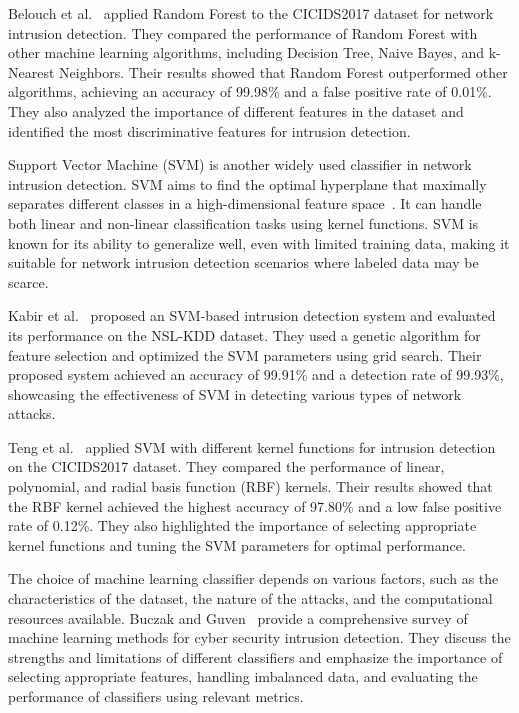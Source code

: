 Belouch et al.~\cite{belouch2018performance} applied Random Forest to the CICIDS2017 dataset for network intrusion detection. They compared the performance of Random Forest with other machine learning algorithms, including Decision Tree, Naive Bayes, and k-Nearest Neighbors. Their results showed that Random Forest outperformed other algorithms, achieving an accuracy of 99.98\% and a false positive rate of 0.01\%. They also analyzed the importance of different features in the dataset and identified the most discriminative features for intrusion detection.

Support Vector Machine (SVM) is another widely used classifier in network intrusion detection. SVM aims to find the optimal hyperplane that maximally separates different classes in a high-dimensional feature space~\cite{cortes1995support}. It can handle both linear and non-linear classification tasks using kernel functions. SVM is known for its ability to generalize well, even with limited training data, making it suitable for network intrusion detection scenarios where labeled data may be scarce.

Kabir et al.~\cite{kabir2017network} proposed an SVM-based intrusion detection system and evaluated its performance on the NSL-KDD dataset. They used a genetic algorithm for feature selection and optimized the SVM parameters using grid search. Their proposed system achieved an accuracy of 99.91\% and a detection rate of 99.93\%, showcasing the effectiveness of SVM in detecting various types of network attacks.

Teng et al.~\cite{teng2017svm} applied SVM with different kernel functions for intrusion detection on the CICIDS2017 dataset. They compared the performance of linear, polynomial, and radial basis function (RBF) kernels. Their results showed that the RBF kernel achieved the highest accuracy of 97.80\% and a low false positive rate of 0.12\%. They also highlighted the importance of selecting appropriate kernel functions and tuning the SVM parameters for optimal performance.

The choice of machine learning classifier depends on various factors, such as the characteristics of the dataset, the nature of the attacks, and the computational resources available. Buczak and Guven~\cite{buczak2015survey} provide a comprehensive survey of machine learning methods for cyber security intrusion detection. They discuss the strengths and limitations of different classifiers and emphasize the importance of selecting appropriate features, handling imbalanced data, and evaluating the performance of classifiers using relevant metrics.

